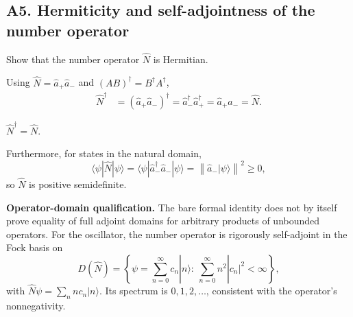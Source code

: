 \documentclass[11pt,a4paper]{article}
\newcommand{\key}[1]{\begin{resultbox}\centering\(\displaystyle #1\)\end{resultbox}}
\newcommand{\bra}[1]{\langle #1|}\newcommand{\ket}[1]{|#1\rangle}
\newcommand{\norm}[1]{\left\lVert#1\right\rVert}
\begin{document}
\subsection{A5. Hermiticity and self-adjointness of the number operator}
\begin{questionbox}
Show that the number operator \(\hat N\) is Hermitian.
\end{questionbox}
Using \(\hat N=\hat a_+\hat a_-\) and \((AB)^\dagger=B^\dagger A^\dagger\),
\begin{align}
\hat N^\dagger&=(\hat a_+\hat a_-)^\dagger=\hat a_-^\dagger\hat a_+^\dagger=\hat a_+\hat a_-=\hat N.
\end{align}
\key{\boxed{\hat N^\dagger=\hat N.}}
Furthermore, for states in the natural domain,
\begin{equation}\bra\psi\hat N\ket\psi=\bra\psi\hat a_-^\dagger\hat a_-\ket\psi=\norm{\hat a_-\ket\psi}^2\ge0,\end{equation}
so \(\hat N\) is positive semidefinite.

\textbf{Operator-domain qualification.} The bare formal identity does not by itself prove equality of full adjoint domains for arbitrary products of unbounded operators. For the oscillator, the number operator is rigorously self-adjoint in the Fock basis on
\begin{equation}
D(\hat N)=\left\{\psi=\sum_{n=0}^{\infty}c_n\ket n:\ \sum_{n=0}^{\infty}n^2|c_n|^2<\infty\right\},
\end{equation}
with \(\hat N\psi=\sum_nnc_n\ket n\). Its spectrum is \(0,1,2,\ldots\), consistent with the operator's nonnegativity.
\end{document}
